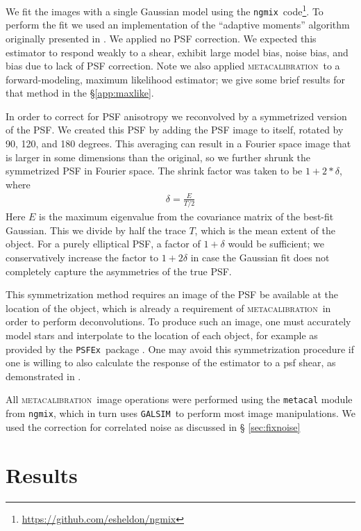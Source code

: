 \documentclass[iop]{emulateapj}
\newcommand{\mcal}{\textsc{metacalibration}}
\newcommand{\psfex}{\texttt{PSFEx}}
\newcommand{\ngmix}{\texttt{ngmix}}
\newcommand{\galsim}{\texttt{GALSIM}}
\begin{document}
We fit the images with a single Gaussian model using the \ngmix\
code\footnote{\url{https://github.com/esheldon/ngmix}}.  To perform the fit we used an
implementation of the ``adaptive moments'' algorithm originally presented in
\cite{bj02}.   We applied no PSF correction.  We expected this estimator to
respond weakly to a shear, exhibit large model bias, noise bias, and bias
due to lack of PSF correction.  Note we also applied \mcal\ to a forward-modeling,
maximum likelihood estimator; we give some brief results for that method
in the \S \ref{app:maxlike}.

In order to correct for PSF anisotropy  we reconvolved by a symmetrized version
of the PSF. We created this PSF by adding the PSF image to itself, rotated by
90, 120, and 180 degrees.  This averaging can result in a Fourier space image
that is larger in some dimensions than the original, so we further shrunk
the symmetrized PSF in Fourier space.  The shrink factor was taken to be
$1+2*\delta$, where
\begin{align}
    \delta = \frac{E}{T/2}
\end{align}
Here $E$ is the maximum eigenvalue from the covariance matrix of the best-fit
Gaussian. This we divide by half the trace $T$, which is the mean extent of the
object.  For a purely elliptical PSF, a factor of $1+\delta$ would be
sufficient; we conservatively increase the factor to $1+2\delta$ in case the
Gaussian fit does not completely capture the asymmetries of the true PSF.

This symmetrization method requires an image of the PSF be available at the
location of the object, which is already a requirement of \mcal\ in order to
perform deconvolutions.  To produce such an image, one must accurately model
stars and interpolate to the location of each object, for example as provided
by the \psfex\ package \citep{BertinPSFEx2011}.  One may avoid this
symmetrization procedure if one is willing to also calculate the response of
the estimator to a psf shear, as demonstrated in \citep{HuffMcal}.

All \mcal\ image operations were performed using the \texttt{metacal} module
from \ngmix, which in turn uses \galsim\ to perform most image manipulations.
We used the correction for correlated noise as discussed in \S
\ref{sec:fixnoise}


\section{Results} \label{sec:results}
\end{document}
